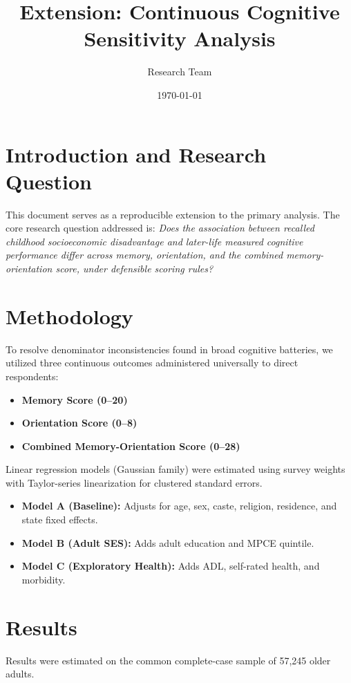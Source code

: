 \documentclass[12pt]{article}
\title{Extension: Continuous Cognitive Sensitivity Analysis}
\author{Research Team}
\date{\today}
\begin{document}
\maketitle

\section{Introduction and Research Question}
This document serves as a reproducible extension to the primary analysis. The core research question addressed is: \textit{Does the association between recalled childhood socioeconomic disadvantage and later-life measured cognitive performance differ across memory, orientation, and the combined memory-orientation score, under defensible scoring rules?}

\section{Methodology}
To resolve denominator inconsistencies found in broad cognitive batteries, we utilized three continuous outcomes administered universally to direct respondents:
\begin{itemize}
    \item \textbf{Memory Score (0--20)}
    \item \textbf{Orientation Score (0--8)}
    \item \textbf{Combined Memory-Orientation Score (0--28)}
\end{itemize}

Linear regression models (Gaussian family) were estimated using survey weights with Taylor-series linearization for clustered standard errors. 
\begin{itemize}
    \item \textbf{Model A (Baseline):} Adjusts for age, sex, caste, religion, residence, and state fixed effects.
    \item \textbf{Model B (Adult SES):} Adds adult education and MPCE quintile.
    \item \textbf{Model C (Exploratory Health):} Adds ADL, self-rated health, and morbidity.
\end{itemize}

\section{Results}
Results were estimated on the common complete-case sample of 57,245 older adults.
\end{document}
